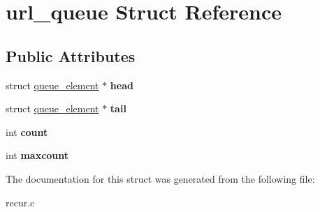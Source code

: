 \hypertarget{structurl__queue}{}\section{url\+\_\+queue Struct Reference}
\label{structurl__queue}
\subsection*{Public Attributes}
\begin{DoxyCompactItemize}
\item 
\mbox{\label{structurl__queue_ad89de5744eae60cabb9fed25bdabdf1e}} 
struct \mbox{\hyperlink{structqueue__element}{queue\+\_\+element}} $\ast$ {\bfseries head}
\item 
\mbox{\label{structurl__queue_a67fb12f127c150c28ef5a88e1c91f383}} 
struct \mbox{\hyperlink{structqueue__element}{queue\+\_\+element}} $\ast$ {\bfseries tail}
\item 
\mbox{\label{structurl__queue_abe8d4659986873b2c2411601a0fd0cad}} 
int {\bfseries count}
\item 
\mbox{\label{structurl__queue_ad9a33d6fd931ea1d0b26554b45dc61af}} 
int {\bfseries maxcount}
\end{DoxyCompactItemize}


The documentation for this struct was generated from the following file\+:\begin{DoxyCompactItemize}
\item 
recur.\+c\end{DoxyCompactItemize}
